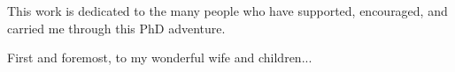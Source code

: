 %
%
%
%
\enlargethispage{0.5\baselineskip}
This work is dedicated to the many people who have supported, encouraged, and carried me through this PhD adventure.

First and foremost, to my wonderful wife and children...
